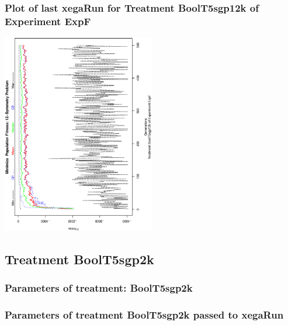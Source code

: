 \documentclass[18pt,c]{beamer}
\begin{document}
 \begin{frame}
 \frametitle{ Plot of last xegaRun for Treatment BoolT5sgp12k of Experiment ExpF }
 \begin{center}
\includegraphics[width=0.5\textwidth, angle=-90]
{ExpFPlotPopStatsFigure002.eps}
 \end{center}
 \label{report/ExpFPlotPopStatsFigure002.eps}  
 \end{frame}

\clearpage
\subsection{Treatment BoolT5sgp2k}

 \begin{frame}
 \fontsize{8pt}{9pt}\selectfont
 \frametitle{  Parameters of treatment: BoolT5sgp2k 
 }

 \label{ExpFtParmTable012.tex}  
 \end{frame}


 \begin{frame}
 \fontsize{8pt}{9pt}\selectfont
 \frametitle{  Parameters of treatment BoolT5sgp2k passed to xegaRun
 }

 \label{ExpFtParmTable013.tex}  
 \end{frame}
\end{document}

